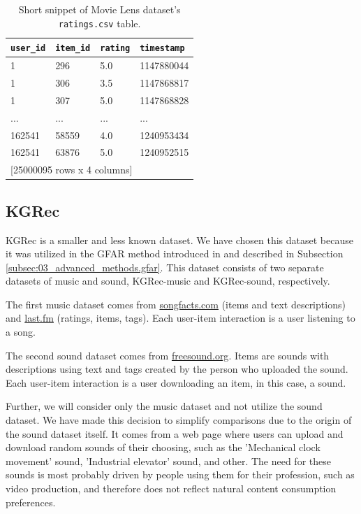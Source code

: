 \begin{table}[!ht]
\centering
\begin{tabular}{ l l l l }


\verb|user_id| & \verb|item_id| & \verb|rating| & \verb|timestamp| \\
    \hline
    1 &      296  &   5.0 & 1147880044 \\
    1 &      306  &   3.5 & 1147868817 \\
    1 &      307  &   5.0 & 1147868828 \\
  ... &      ...  &   ... &        ... \\
162541 &    58559  &   4.0 & 1240953434 \\
162541 &    63876  &   5.0 & 1240952515 \\ [1mm]
\multicolumn{4}{l}{{[25000095 rows x 4 columns]}}
\end{tabular}
\caption{Short snippet of Movie Lens dataset's \texttt{ratings.csv} table.}
\label{table:5.1_ML_ratings}
\end{table}




\subsection{KGRec}
\label{subsec:04_single_user_datasets.kgrec}
KGRec is a smaller and less known dataset. We have chosen this dataset because it was utilized in the GFAR method introduced in \cite{GFAR-kaya2020} and described in Subsection \ref{subsec:03_advanced_methods.gfar}. This dataset consists of two separate datasets of music and sound, KGRec-music and KGRec-sound, respectively.

The first music dataset comes from \href{https://www.songfacts.com/}{songfacts.com} (items and text descriptions) and \href{https://www.last.fm/}{last.fm} (ratings, items, tags). Each user-item interaction is a user listening to a song.

The second sound dataset comes from \href{https://freesound.org/}{freesound.org}. Items are sounds with descriptions using text and tags created by the person who uploaded the sound. Each user-item interaction is a user downloading an item, in this case, a sound.

Further, we will consider only the music dataset and not utilize the sound dataset. We have made this decision to simplify comparisons due to the origin of the sound dataset itself. It comes from a web page where users can upload and download random sounds of their choosing, such as the 'Mechanical clock movement' sound, 'Industrial elevator' sound, and other. The need for these sounds is most probably driven by people using them for their profession, such as video production, and therefore does not reflect natural content consumption preferences.

